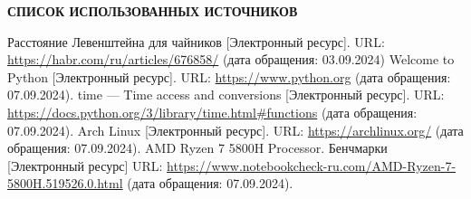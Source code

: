 \renewcommand{\bibname}{}
\begin{thebibliography}{6}
\renewcommand{\bibname}{СПИСОК ИСПОЛЬЗОВАННЫХ ИСТОЧНИКОВ}
\begin{center}
    \textbf{\bibname}
\end{center}
        Расстояние Левенштейна для чайников [Электронный ресурс].
        URL: \url{https://habr.com/ru/articles/676858/}
        (дата обращения: 03.09.2024)
	Welcome to Python [Электронный ресурс].
        URL: \url{https://www.python.org}
        (дата обращения: 07.09.2024).
	time — Time access and conversions [Электронный ресурс].
        URL: \url{https://docs.python.org/3/library/time.html#functions}
        (дата обращения: 07.09.2024).
        Arch Linux [Электронный ресурс].
        URL: \url{https://archlinux.org/}
        (дата обращения: 07.09.2024).
        AMD Ryzen 7 5800H Processor. Бенчмарки [Электронный ресурс]
        URL: \url{https://www.notebookcheck-ru.com/AMD-Ryzen-7-5800H.519526.0.html}
        (дата обращения: 07.09.2024).
\end{thebibliography}
